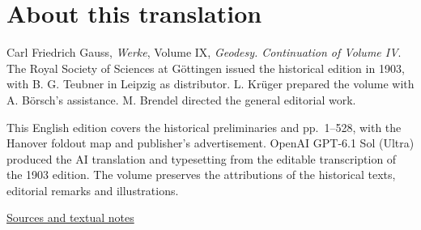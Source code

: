 \section*{About this translation}
\noindent Carl Friedrich Gauss, \textit{Werke}, Volume IX, \textit{Geodesy. Continuation of Volume IV}. The Royal Society of Sciences at Göttingen issued the historical edition in 1903, with B. G. Teubner in Leipzig as distributor. L. Krüger prepared the volume with A. Börsch’s assistance. M. Brendel directed the general editorial work.

This English edition covers the historical preliminaries and pp.~1--528, with the Hanover foldout map and publisher's advertisement. OpenAI GPT-6.1 Sol (Ultra) produced the AI translation and typesetting from the editable transcription of the 1903 edition. The volume preserves the attributions of the historical texts, editorial remarks and illustrations.

\noindent\hyperlink{gaussix-sources}{Sources and textual notes}
